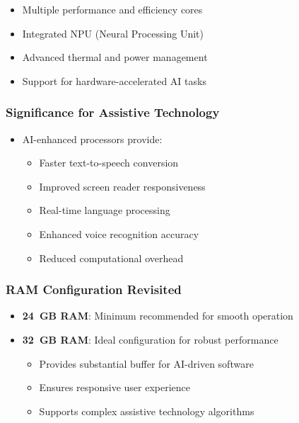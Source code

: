 \begin{enumerate}
\begin{itemize}
\begin{itemize}
\item Multiple performance and efficiency cores \cite{IntelHybridArchitecture}
\item Integrated NPU (Neural Processing Unit) \cite{IntelNPU, AMDAIProcessing}
\item Advanced thermal and power management \cite{IntelThermalManagement}
\item Support for hardware-accelerated AI tasks \cite{IntelAIAcceleration, AMDAIAcceleration}
\end{itemize}

\end{itemize}

\end{enumerate}


\subsubsection{Significance for Assistive Technology}

\begin{itemize}
\item AI-enhanced processors provide:

\begin{itemize}
\item Faster text-to-speech conversion \cite{AIinAccessibility}
\item Improved screen reader responsiveness \cite{AIinAccessibility}
\item Real-time language processing \cite{AIinAccessibility}
\item Enhanced voice recognition accuracy \cite{AIinAccessibility}
\item Reduced computational overhead \cite{AIinAccessibility}
\end{itemize}

\end{itemize}


\subsubsection{RAM Configuration Revisited}

\begin{itemize}
\item \textbf{24~GB RAM}: Minimum recommended for smooth operation \cite{EducationalEquityReport2024}
\item \textbf{32~GB RAM}: Ideal configuration for robust performance \cite{EducationalEquityReport2024}

\begin{itemize}
\item Provides substantial buffer for AI-driven software \cite{AIinAccessibility}
\item Ensures responsive user experience \cite{EducationalEquityReport2024}
\item Supports complex assistive technology algorithms \cite{AIinAccessibility}
\end{itemize}

\end{itemize}



